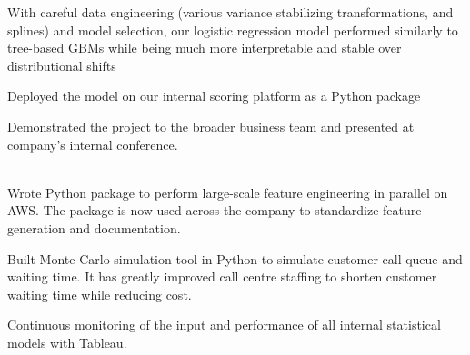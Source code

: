 \begin{cventries}
{\begin{cvitems}
\begin{cvitems}
          \item {With careful data engineering (various variance stabilizing transformations, and splines) and model selection, our logistic regression model performed similarly to tree-based GBMs while being much more interpretable and stable over distributional shifts}
          \item {Deployed the model on our internal scoring platform as a Python package}
          \item {Demonstrated the project to the broader business team and presented at company's internal conference.}\\\\
        \end{cvitems}
        \item {Wrote Python package to perform large-scale feature engineering in parallel on AWS. The package is now used across the company to standardize feature generation and documentation.}\\
        \item {Built Monte Carlo simulation tool in Python to simulate customer call queue and waiting time. It has greatly improved call centre staffing to shorten customer waiting time while reducing cost.}\\
        \item {Continuous monitoring of the input and performance of all internal statistical models with Tableau.}
      \end{cvitems}
    }

\end{cventries}
